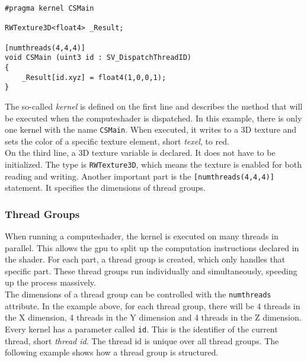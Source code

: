 \begin{lstlisting}[language=HLSL, caption=A standard \gls{computeshader} template., label=lst:shader:compute:standard]
#pragma kernel CSMain

RWTexture3D<float4> _Result;

[numthreads(4,4,4)]
void CSMain (uint3 id : SV_DispatchThreadID)
{
    _Result[id.xyz] = float4(1,0,0,1);
}
\end{lstlisting}

\noindent
The so-called \emph{\gls{kernel}} is defined on the first line and describes the method that will be executed when the \gls{computeshader} is dispatched.
In this example, there is only one \gls{kernel} with the name \lstinline[language=HLSL]{CSMain}.
When executed, it writes to a 3D texture and sets the color of a specific texture element, short \emph{\gls{texel}}, to red.
\\
On the third line, a 3D texture variable is declared.
It does not have to be initialized.
The type is \lstinline[language=HLSL]{RWTexture3D}, which means the texture is enabled for both reading and writing.
Another important part is the \lstinline[language=HLSL]{[numthreads(4,4,4)]} statement. It specifies the dimensions of thread groups.

\subsubsection{Thread Groups}
When running a \gls{computeshader}, the \gls{kernel} is executed on many threads in parallel.
This allows the \gls{gpu} to split up the computation instructions declared in the \gls{shader}.
For each part, a thread group is created, which only handles that specific part.
These thread groups run individually and simultaneously, speeding up the process massively.
\\
The dimensions of a thread group can be controlled with the \lstinline[language=HLSL]{numthreads} attribute.
In the example above, for each thread group, there will be 4 threads in the X dimension, 4 threads in the Y dimension and 4 threads in the Z dimension.
\emptyline
Every \gls{kernel} has a parameter called \lstinline[language=HLSL]{id}. This is the identifier of the current thread, short \emph{thread id}.
The thread id is unique over all thread groups. The following example shows how a thread group is structured.

